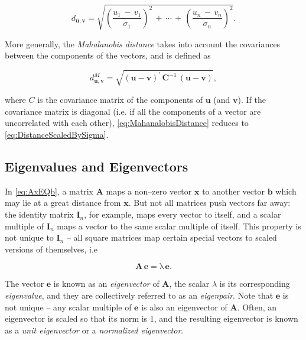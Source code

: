 \documentclass[graybox,envcountchap,sectrefs]{svmono}\usepackage[]{graphicx}\usepackage[]{xcolor}
\begin{document}
\begin{appendices}
\begin{equation}
d_{\mathrm{\mathbf{u}},\mathrm{\mathbf{v}}}=\sqrt{\left(\frac{u_{1}\,-\,v_{1}}{\sigma_{1}}\right)^{2}\,+\,\cdots\,+\,\left(\frac{u_{n}\,-\,v_{n}}{\sigma_{n}}\right)^{2}}.\label{eq:DistanceScaledBySigma}
\end{equation}

More generally, the \emph{Mahalanobis distance} takes into account
the covariances between the components of the vectors, and is defined
as

\begin{equation}
d_{\mathrm{\mathbf{u}},\mathrm{\mathbf{v}}}^{M}=\sqrt{\left(\mathrm{\mathbf{u}}-\mathrm{\mathbf{v}}\right)^{\prime}\,\mathrm{\mathbf{C}}^{-1}\,\left(\mathrm{\mathbf{u}}-\mathrm{\mathbf{v}}\right)},\label{eq:MahanalobisDistance}
\end{equation}

where $C$ is the covariance matrix of the components of $\mathrm{\mathbf{u}}$
(and $\mathrm{\mathbf{v}}$). If the covariance matrix is diagonal
(i.e. if all the components of a vector are uncorrelated with each
other), \eqref{eq:MahanalobisDistance} reduces to \eqref{eq:DistanceScaledBySigma}.

\subsection{Eigenvalues and Eigenvectors}

In \eqref{eq:AxEQb}, a matrix $\mathrm{\mathbf{A}}$ maps a non--zero
vector $\mathrm{\mathbf{x}}$ to another vector $\mathrm{\mathbf{b}}$
which may lie at a great distance from $\mathrm{\mathbf{x}}$. But
not all matrices push vectors far away: the identity matrix $\mathrm{\mathbf{I}}_{n}$,
for example, maps every vector to itself, and a scalar multiple of
$\mathrm{\mathbf{I}}_{n}$ maps a vector to the same scalar multiple
of itself. This property is not unique to $\mathrm{\mathbf{I}}_{n}$
-- all square matrices map certain special vectors to scaled versions
of themselves, i.e

\begin{equation}
\mathrm{\mathbf{A}\,\mathrm{\mathbf{e}}=\lambda\,\mathrm{\mathbf{e}}.}\label{eq:Eigenvector1}
\end{equation}

The vector $\mathrm{\mathbf{e}}$ is known as an \emph{eigenvector}
of $\mathrm{\mathbf{A}}$, the scalar $\lambda$ is its corresponding
\emph{eigenvalue}, and they are collectively referred to as an \emph{eigenpair}.
Note that $\mathrm{\mathbf{e}}$ is not unique -- any scalar multiple
of $\mathrm{\mathbf{e}}$ is also an eigenvector of $\mathrm{\mathbf{A}}$.
Often, an eigenvector is scaled so that its norm is 1, and the resulting
eigenvector is known as a \emph{unit eigenvector} or a \emph{normalized
eigenvector}.


\end{appendices}
\end{document}

